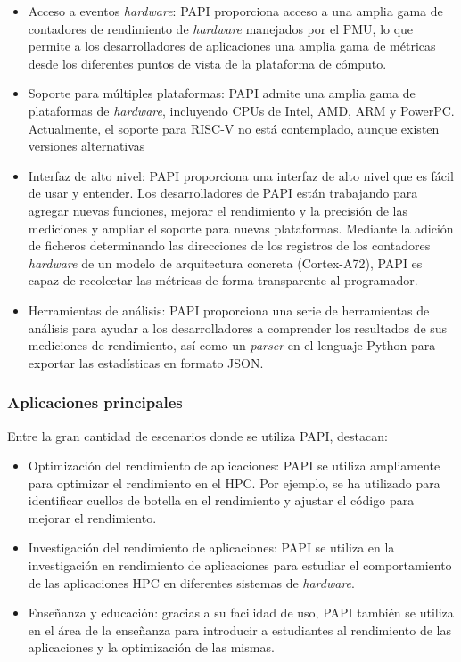 \begin{itemize}
    \item Acceso a eventos \textit{hardware}: \ac{PAPI} proporciona acceso a una amplia gama de contadores de rendimiento de \textit{hardware} manejados por el \ac{PMU}, lo que permite a los desarrolladores de aplicaciones una amplia gama de métricas desde los diferentes puntos de vista de la plataforma de cómputo.
    
    \item Soporte para múltiples plataformas: \ac{PAPI} admite una amplia gama de plataformas de \textit{hardware}, incluyendo \ac{CPU}s de Intel, AMD, \ac{ARM} y PowerPC. Actualmente, el soporte para \ac{RISC}-V no está contemplado, aunque existen versiones alternativas ~\cite{bsc-riscv}
    
    \item Interfaz de alto nivel: \ac{PAPI} proporciona una interfaz de alto nivel que es fácil de usar y entender. Los desarrolladores de \ac{PAPI} están trabajando para agregar nuevas funciones, mejorar el rendimiento y la precisión de las mediciones y ampliar el soporte para nuevas plataformas. Mediante la adición de ficheros determinando las direcciones de los registros de los contadores \textit{hardware} de un modelo de arquitectura concreta (Cortex-A72), \ac{PAPI} es capaz de recolectar las métricas de forma transparente al programador.
    
    \item Herramientas de análisis: \ac{PAPI} proporciona una serie de herramientas de análisis para ayudar a los desarrolladores a comprender los resultados de sus mediciones de rendimiento, así como un \textit{parser} en el lenguaje Python para exportar las estadísticas en formato \ac{JSON}.
\end{itemize}

\subsubsection{Aplicaciones principales}
Entre la gran cantidad de escenarios donde se utiliza \ac{PAPI}, destacan:

\begin{itemize}
    \item Optimización del rendimiento de aplicaciones: \ac{PAPI} se utiliza ampliamente para optimizar el rendimiento en el \ac{HPC}. Por ejemplo, se ha utilizado para identificar cuellos de botella en el rendimiento y ajustar el código para mejorar el rendimiento.
    
    \item Investigación del rendimiento de aplicaciones: \ac{PAPI} se utiliza en la investigación en rendimiento de aplicaciones para estudiar el comportamiento de las aplicaciones \ac{HPC} en diferentes sistemas de \textit{hardware}.
    
    \item Enseñanza y educación: gracias a su facilidad de uso, \ac{PAPI} también se utiliza en el área de la enseñanza para introducir a estudiantes al rendimiento de las aplicaciones y la optimización de las mismas.
\end{itemize}

